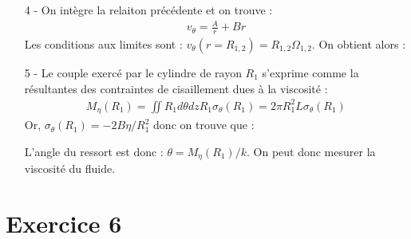 \documentclass{report}
\begin{document}
\begin{itemize}
	\item[4 - ] On intègre la relaiton précédente et on trouve :
	\begin{align*}
		v_\theta = \frac{A}{r} + Br
	\end{align*}
	Les conditions aux limites sont : $v_\theta(r=R_{1,2})=R_{1,2}\Omega_{1,2}$. On obtient alors : 
	
	\noindent{}

\item[5 - ] Le couple exercé par le cylindre de rayon $R_1$ s'exprime comme la résultantes des contraintes de cisaillement dues à la viscosité :
\begin{align*}
	M_{\eta}(R_1)=\iint R_1d\theta dz R_1\sigma_\theta(R_1)= 2\pi R_1^2L\sigma_\theta(R_1)
\end{align*}
Or, $\sigma_\theta(R_1) = -2B\eta/R_1^2$ donc on trouve que :

\noindent{}

L'angle du ressort est donc : $\theta = M_{\eta}(R_1)/k$. On peut donc mesurer la viscosité du fluide.

\end{itemize}

\newpage

\section{Exercice 6}
\end{document}
